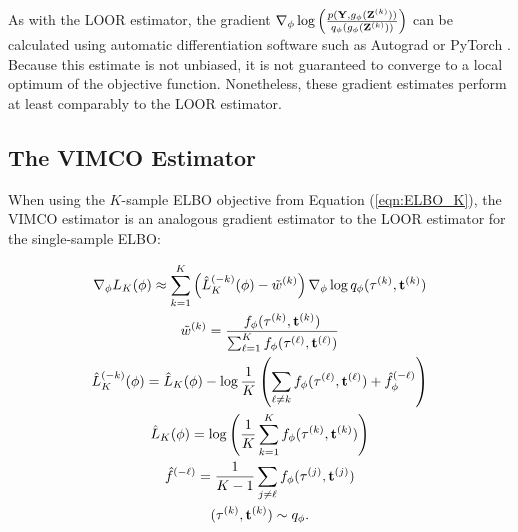 As with the LOOR estimator, the gradient $\nabla_{\phi} \log\left(\frac{p(\mathbf{Y}, g_{\phi}(\mathbf{Z}^{(k)}))}{q_\phi(g_{\phi}(\mathbf{Z}^{(k)}))}\right)$ can be calculated using automatic differentiation software such as Autograd \citep{Maclaurin:2015} or PyTorch \citep{Paszke:2019}. Because this estimate is not unbiased, it is not guaranteed to converge to a local optimum of the objective function. Nonetheless, these gradient estimates perform at least comparably to the LOOR estimator.

\subsection{The VIMCO Estimator}

When using the $K$-sample ELBO objective from Equation (\ref{eqn:ELBO_K}), the VIMCO estimator is an analogous gradient estimator to the LOOR estimator for the single-sample ELBO:

\begin{gather}
     \nabla_\phi L_K(\phi) \approx \sum_{k=1}^K \left(\hat L_K^{(-k)}(\phi) - \tilde w^{(k)}\right) \nabla_{\phi} \log q_\phi(\tau^{(k)},\mathbf{t}^{(k)}) \\
     \tilde w^{(k)} = \frac{f_\phi(\tau^{(k)},\mathbf{t}^{(k)})}{\sum_{\ell=1}^K f_\phi(\tau^{(\ell)},\mathbf{t}^{(\ell)})} \\
     \hat L_K^{(-k)}(\phi) = \hat L_K(\phi) - \log \frac{1}{K}\left(\sum_{\ell \neq k} f_\phi(\tau^{(\ell)},\mathbf{t}^{(\ell)}) + \hat f_\phi^{(-\ell)} \right) \\
     \hat L_K(\phi) = \log \left(\frac{1}{K}\sum_{k=1}^K f_\phi(\tau^{(k)},\mathbf{t}^{(k)}) \right) \\
     \hat f^{(-\ell)} = \frac{1}{K-1} \sum_{j \neq \ell} f_\phi(\tau^{(j)},\mathbf{t}^{(j)}) \\
    (\tau^{(k)},\mathbf{t}^{(k)}) \sim q_{\phi}.
\end{gather}